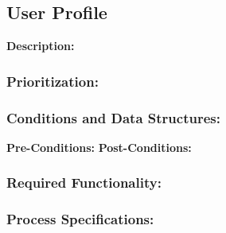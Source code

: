 \subsection{User Profile}
\textbf{Description:}
\subsubsection{Prioritization:}
\subsubsection{Conditions and Data Structures:}
\textbf{Pre-Conditions:}
\textbf{Post-Conditions:}	
\subsubsection{Required Functionality:} 
\subsubsection{Process Specifications:}